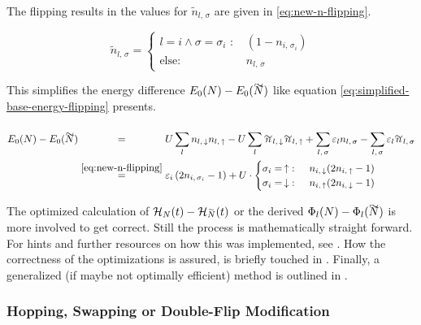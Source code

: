 The flipping results in the values for $\tilde{n}_{l,\,\sigma}$ are given in \autoref{eq:new-n-flipping}.

\begin{equation}
    \label{eq:new-n-flipping}
    \tilde{n}_{l,\,\sigma} = \begin{cases}
        l = i \land \sigma = \sigma_i\text{ : }  &  (1 - n_{i,\,\sigma_i})  \\
        \text{else: }   &    n_{l,\,\sigma} 
    \end{cases}
\end{equation}

This simplifies the energy difference $E_0(N)-E_0(\vphantom{N}\smash{\tilde{N}})$ like equation \autoref{eq:simplified-base-energy-flipping} presents.

\begin{equation}
    \label{eq:simplified-base-energy-flipping}
    \begin{split}
        E_0(N)-E_0(\vphantom{N}\smash{\tilde{N}}) 
        &\stackrel{\phantom{\ref{eq:new-n-flipping}}}{=} U\lsum n_{l,\,\down}n_{l,\,\up}-U\lsum \tilde{n}_{l,\,\down}\tilde{n}_{l,\,\up} 
        + \lsum[l,\,\sigma] \epsl n_{l,\,\sigma} - \lsum[l,\,\sigma] \epsl \tilde{n}_{l,\,\sigma}\\
        &\stackrel{\ref{eq:new-n-flipping}}{=} \epsl[i] \left(2 n_{i,\,\sigma_i} - 1\right) +
        U\cdot \begin{cases}
            \sigma_i = \,\up\text{: }   & n_{i,\,\down} (2 n_{i,\,\up} - 1)\\
            \sigma_i = \,\down\text{: } & n_{i,\,\up} (2 n_{i,\,\down} - 1)  
        \end{cases}
    \end{split}
\end{equation}

The optimized calculation of $\HNOft - \HNOft[\vphantom{N}\smash{\tilde{N}}]$ or the derived $\Phi_l(N) - \Phi_l(\vphantom{N}\smash{\tilde{N}})$ is more involved to get correct.
Still the process is mathematically straight forward. 
For hints and further resources on how this was implemented, see .
How the correctness of the optimizations is assured, is briefly touched in .
Finally, a generalized (if maybe not optimally efficient) method is outlined in .

\subsubsection*{Hopping, Swapping or Double-Flip Modification}
\label{sec:theory-optimization-hopping}

